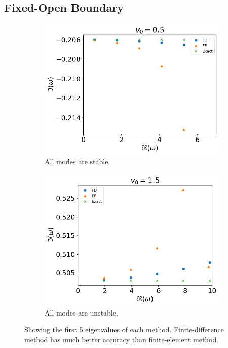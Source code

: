 \subsection{Fixed-Open Boundary}
\begin{figure}[H]
	\centering
	\begin{subfigure}{0.5\textwidth}
		\includegraphics[width=\linewidth]{img/numerical_experiments/fixed_open/constant_v_v0=0.5}
		\caption{All modes are stable.}
	\end{subfigure}%
	\begin{subfigure}{0.5\textwidth}
		\includegraphics[width=\linewidth]{img/numerical_experiments/fixed_open/constant_v_v0=1.5}
		\caption{All modes are unstable.}
	\end{subfigure}
	\caption{Showing the first 5 eigenvalues of each method. Finite-difference method has much better accuracy than finite-element method.}
	\label{fig:constant_v_fixed_open}
\end{figure}


